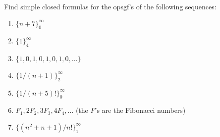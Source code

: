 \begin{exercise} \label{ex:2-4}
    Find simple closed formulas for the opsgf's of the following sequences:
    \begin{enumerate}[label=(\alph*)]
        \item $\{n+7\}_0^\infty$
        \item $\{1\}_4^\infty$
        \item $\{1,0,1,0,1,0,1,0,\ldots\}$
        \item $\{1/(n+1)\}_2^\infty$
        \item $\{1/(n+5)!\}_0^\infty$
        \item $F_1,2F_2,3F_3,4F_4,\ldots$ (the $F$'s are the Fibonacci numbers)
        \item $\{(n^2 + n + 1) / n!\}_1^\infty$
    \end{enumerate}
\end{exercise}
